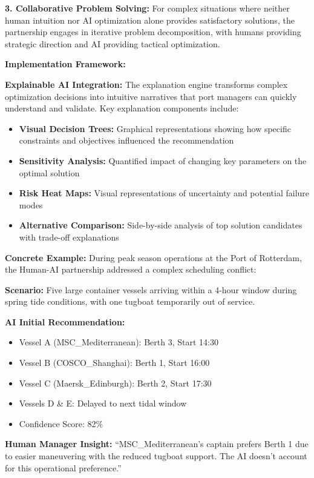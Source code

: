 \documentclass{article}
\begin{document}
\textbf{3. Collaborative Problem Solving:} For complex situations where neither human intuition nor AI optimization alone provides satisfactory solutions, the partnership engages in iterative problem decomposition, with humans providing strategic direction and AI providing tactical optimization.

\textbf{Implementation Framework:}


\textbf{Explainable AI Integration:}
The explanation engine transforms complex optimization decisions into intuitive narratives that port managers can quickly understand and validate. Key explanation components include:

\begin{itemize}
\item \textbf{Visual Decision Trees:} Graphical representations showing how specific constraints and objectives influenced the recommendation
\item \textbf{Sensitivity Analysis:} Quantified impact of changing key parameters on the optimal solution
\item \textbf{Risk Heat Maps:} Visual representations of uncertainty and potential failure modes
\item \textbf{Alternative Comparison:} Side-by-side analysis of top solution candidates with trade-off explanations
\end{itemize}

\textbf{Concrete Example:} During peak season operations at the Port of Rotterdam, the Human-AI partnership addressed a complex scheduling conflict:

\textbf{Scenario:} Five large container vessels arriving within a 4-hour window during spring tide conditions, with one tugboat temporarily out of service.

\textbf{AI Initial Recommendation:}
\begin{itemize}
\item Vessel A (MSC\_Mediterranean): Berth 3, Start 14:30
\item Vessel B (COSCO\_Shanghai): Berth 1, Start 16:00  
\item Vessel C (Maersk\_Edinburgh): Berth 2, Start 17:30
\item Vessels D \& E: Delayed to next tidal window
\item Confidence Score: 82\%
\end{itemize}

\textbf{Human Manager Insight:} ``MSC\_Mediterranean's captain prefers Berth 1 due to easier maneuvering with the reduced tugboat support. The AI doesn't account for this operational preference.''
\end{document}
